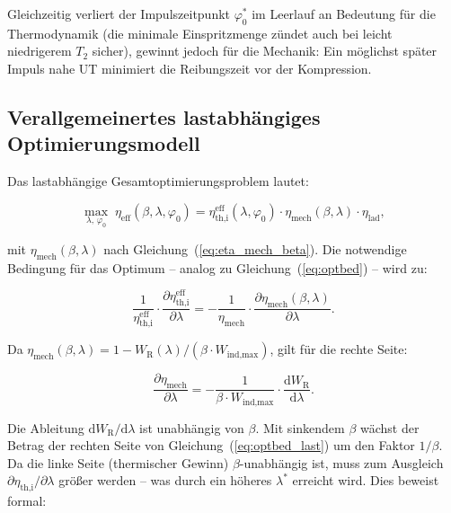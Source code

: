 ﻿\documentclass[a4paper,12pt]{article}
\begin{document}
Gleichzeitig verliert der Impulszeitpunkt $\varphi_0^*$ im Leerlauf an
Bedeutung für die Thermodynamik (die minimale Einspritzmenge zündet auch
bei leicht niedrigerem $T_2$ sicher), gewinnt jedoch für die Mechanik: Ein
möglichst später Impuls nahe UT minimiert die Reibungszeit vor der Kompression.

\subsection{Verallgemeinertes lastabhängiges Optimierungsmodell}

Das lastabhängige Gesamtoptimierungsproblem lautet:

\begin{equation}
  \max_{\lambda,\,\varphi_0} \;
  \eta_\text{eff}(\beta, \lambda, \varphi_0) =
    \eta_\text{th,i}^\text{eff}(\lambda, \varphi_0) \cdot
    \eta_\text{mech}(\beta, \lambda) \cdot \eta_\text{lad},
  \label{eq:opt_last}
\end{equation}

\noindent
mit $\eta_\text{mech}(\beta, \lambda)$ nach Gleichung~(\ref{eq:eta_mech_beta}).
Die notwendige Bedingung für das Optimum -- analog zu Gleichung~(\ref{eq:optbed})
-- wird zu:

\begin{equation}
  \frac{1}{\eta_\text{th,i}^\text{eff}} \cdot
    \frac{\partial \eta_\text{th,i}^\text{eff}}{\partial \lambda}
  = -\frac{1}{\eta_\text{mech}} \cdot
    \frac{\partial \eta_\text{mech}(\beta, \lambda)}{\partial \lambda}.
  \label{eq:optbed_last}
\end{equation}

Da $\eta_\text{mech}(\beta, \lambda) = 1 - W_\text{R}(\lambda) / (\beta \cdot
W_\text{ind,max})$, gilt für die rechte Seite:

\begin{equation}
  \frac{\partial \eta_\text{mech}}{\partial \lambda} =
    -\frac{1}{\beta \cdot W_\text{ind,max}} \cdot
    \frac{\mathrm{d}W_\text{R}}{\mathrm{d}\lambda}.
  \label{eq:deta_mech_dlambda}
\end{equation}

Die Ableitung $\mathrm{d}W_\text{R}/\mathrm{d}\lambda$ ist unabhängig von $\beta$.
Mit sinkendem $\beta$ wächst der Betrag der rechten Seite von
Gleichung~(\ref{eq:optbed_last}) um den Faktor $1/\beta$. Da die linke Seite
(thermischer Gewinn) $\beta$-unabhängig ist, muss zum Ausgleich
$\partial\eta_\text{th,i}/\partial\lambda$ größer werden -- was durch ein
höheres $\lambda^*$ erreicht wird. Dies beweist formal:
\end{document}
